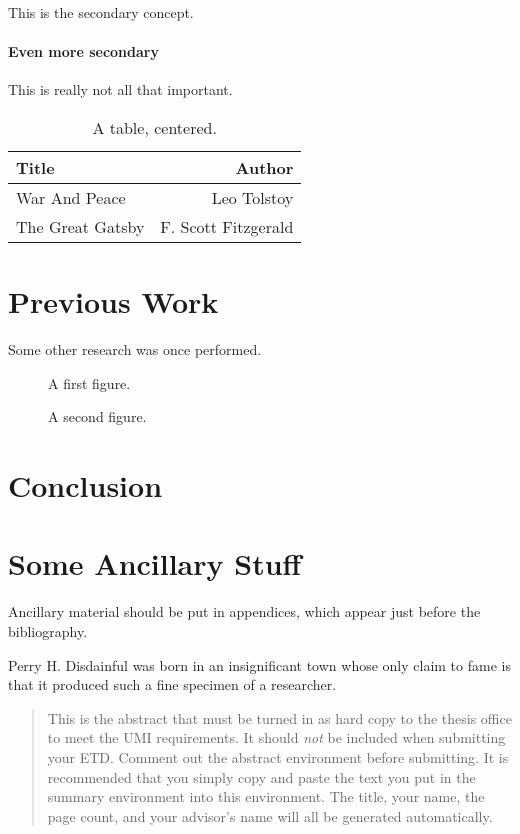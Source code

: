 \documentclass[12pt]{gatech-thesis}
\begin{document}
This is the secondary concept.

\subsubsection{Even more secondary}

This is really not all that important.

\begin{table}
\caption{A table, centered.}
\begin{center}
\begin{tabular}{|l|r|}
  \hline 
Title & Author \\
\hline
War And Peace & Leo Tolstoy \\
The Great Gatsby & F. Scott Fitzgerald \\ \hline
\end{tabular}
\end{center}
\end{table}
\chapter{Previous Work}

Some other research was once performed.

\begin{figure}
\caption{A first figure.}
\end{figure}

\begin{figure}
\caption{A second figure.}
\end{figure}
\chapter{Conclusion}

\nocite{*}
\appendix
\chapter{Some Ancillary Stuff}

Ancillary material should be put in appendices, which 
appear just before the bibliography. 

\begin{postliminary}
{}
\begin{vita}
Perry H. Disdainful was born in an insignificant town
whose only claim to fame is that it produced such a fine
specimen of a researcher.
\end{vita}
\end{postliminary}

\begin{abstract}
  This is the abstract that must be turned in as hard copy to the
  thesis office to meet the UMI requirements. It should \emph{not} be
  included when submitting your ETD. Comment out the abstract
  environment before submitting. It is recommended that you simply
  copy and paste the text you put in the summary environment into this
  environment. The title, your name, the page count, and your
  advisor's name will all be generated automatically.
\end{abstract}
\end{document}
